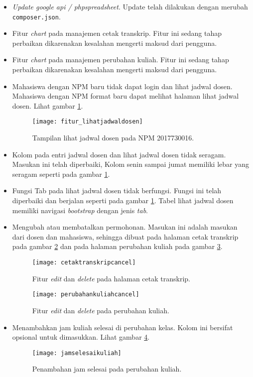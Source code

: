 \documentclass[a4paper,twoside]{article}
\begin{document}
\begin{enumerate}
\begin{itemize}
		\item \textit{Update google api / phpspreadsheet}. Update telah dilakukan dengan merubah \texttt{composer.json}.
				
		\item  Fitur \textit{chart} pada manajemen cetak transkrip. Fitur ini sedang tahap perbaikan dikarenakan kesalahan mengerti maksud dari pengguna.		
		
		\item Fitur \textit{chart} pada manajemen perubahan kuliah. Fitur ini sedang tahap perbaikan dikarenakan kesalahan mengerti maksud dari pengguna.	
		
		\item Mahasiswa dengan NPM baru tidak dapat login dan lihat jadwal dosen. Mahasiswa dengan NPM format baru dapat melihat halaman lihat jadwal dosen. Lihat gambar \ref{fig:lihatjadwaldosen}.		
		\begin{figure}[H]
			\centering
			\texttt{[image: fitur\_lihatjadwaldosen]} 
			\caption{Tampilan lihat jadwal dosen pada NPM 2017730016.}
			\label{fig:lihatjadwaldosen} 
		\end{figure}
				
		\item Kolom pada entri jadwal dosen dan lihat jadwal dosen tidak seragam. Masukan ini telah diperbaiki, Kolom senin sampai jumat memiliki lebar yang seragam seperti pada gambar \ref{fig:lihatjadwaldosen}.		
		\item Fungsi Tab pada lihat jadwal dosen tidak berfungsi. Fungsi ini telah diperbaiki dan berjalan seperti pada gambar \ref{fig:lihatjadwaldosen}. Tabel lihat jadwal dosen memiliki navigasi \textit{bootstrap} dengan jenis \textit{tab}.
		\item Mengubah atau membatalkan permohonan. Masukan ini adalah masukan dari dosen dan mahasiswa, sehingga dibuat pada halaman cetak transkrip pada gambar \ref{fig:cetaktranskripcancel} dan pada halaman perubahan kuliah pada gambar \ref{fig:perubahankuliahcancel}.
		\begin{figure}[H]
			\centering
			\texttt{[image: cetaktranskripcancel]} 
			\caption{Fitur \textit{edit} dan \textit{delete} pada halaman cetak transkrip.}
			\label{fig:cetaktranskripcancel} 
		\end{figure}
	
		\begin{figure}[H]
			\centering
			\texttt{[image: perubahankuliahcancel]} 
			\caption{Fitur \textit{edit} dan \textit{delete} pada perubahan kuliah.}
			\label{fig:perubahankuliahcancel} 
		\end{figure}
		\item Menambahkan jam kuliah selesai di perubahan kelas. Kolom ini bersifat opsional untuk dimasukkan. Lihat gambar \ref{fig:jamselesaikuliah}.
		\begin{figure}[H]
			\centering
			\texttt{[image: jamselesaikuliah]} 
			\caption{Penambahan jam selesai pada perubahan kuliah.}
			\label{fig:jamselesaikuliah} 
		\end{figure}
		

\end{itemize}
\end{enumerate}
\end{document}
